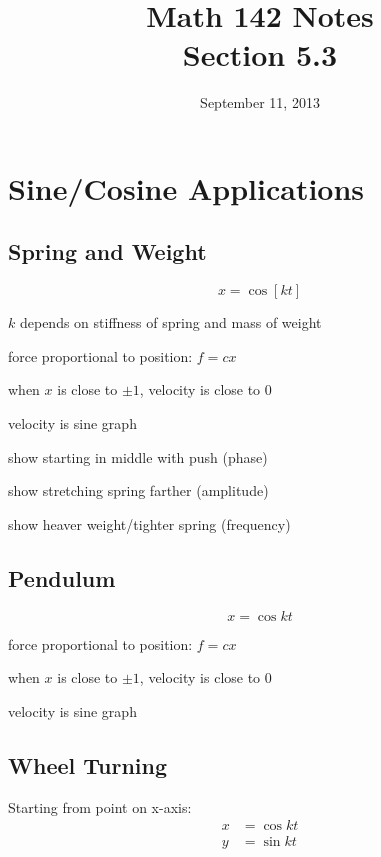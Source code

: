 \documentclass{exam}
\title{Math 142 Notes \\ Section 5.3}
\date{September 11, 2013}
\begin{document}
  \maketitle
  \tableofcontents

  \section{Sine/Cosine Applications}

  \subsection{Spring and Weight}
  \[
    x = \cos \left[ k t \right]
  \]
  \begin{itemize*}
    \item $k$ depends on stiffness of spring and mass of weight
    \item force proportional to position: $f = cx$
    \item when $x$ is close to $\pm 1$, velocity is close to $0$
    \item velocity is sine graph
    \item show starting in middle with push (phase)
    \item show stretching spring farther (amplitude)
    \item show heaver weight/tighter spring (frequency)
  \end{itemize*}

  \subsection{Pendulum}
  \[
    x = \cos kt 
  \]
  \begin{itemize*}
    \item force proportional to position: $f = cx$
    \item when $x$ is close to $\pm 1$, velocity is close to $0$
    \item velocity is sine graph
  \end{itemize*}

  \subsection{Wheel Turning}
  Starting from point on x-axis:
  \begin{align*}
    x &= \cos kt \\
    y &= \sin kt \\
  \end{align*}
\end{document}
